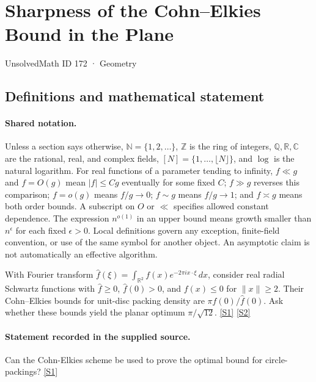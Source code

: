 \documentclass[11pt,a4paper]{article}
\newcommand{\N}{\mathbb{N}}
\newcommand{\Z}{\mathbb{Z}}
\newcommand{\Q}{\mathbb{Q}}
\newcommand{\R}{\mathbb{R}}
\newcommand{\C}{\mathbb{C}}
\newcommand{\sref}[2]{\hyperlink{source:#1:#2}{[S#2]}}
\begin{document}

\setcounter{section}{171}

\section{Sharpness of the Cohn--Elkies Bound in the Plane}\label{172}

{\small\sffamily UnsolvedMath ID 172 · Geometry}

\subsection{Definitions and mathematical statement}

\paragraph{Shared notation.}Unless a section says otherwise, $\N=\{1,2,\ldots\}$,
$\Z$ is the ring of integers, $\Q,\R,\C$ are the rational, real, and complex
fields, $[N]=\{1,\ldots,\lfloor N\rfloor\}$, and $\log$ is the natural
logarithm. For real functions of a parameter tending to infinity,
$f\ll g$ and $f=O(g)$ mean $|f|\leq Cg$ eventually for some fixed $C$;
$f\gg g$ reverses this comparison; $f=o(g)$ means $f/g\to0$;
$f\sim g$ means $f/g\to1$; and $f\asymp g$ means both order bounds.
A subscript on $O$ or $\ll$ specifies allowed constant dependence.
The expression $n^{o(1)}$ in an upper bound means growth smaller than
$n^\epsilon$ for each fixed $\epsilon>0$. Local definitions govern any
exception, finite-field convention, or use of the same symbol for another
object. An asymptotic claim is not automatically an effective algorithm.



With Fourier transform $\widehat f(\xi)=\int_{\R^2}f(x)e^{-2\pi i x\cdot\xi}\,dx$, consider real radial Schwartz functions with $\widehat f\geq0$, $\widehat f(0)>0$, and $f(x)\leq0$ for $\|x\|\geq2$. Their Cohn--Elkies bounds for unit-disc packing density are $\pi f(0)/\widehat f(0)$. Ask whether these bounds yield the planar optimum $\pi/\sqrt{12}$. \sref{172}{1} \sref{172}{2}

\paragraph{Statement recorded in the supplied source.}
Can the Cohn-Elkies scheme be used to prove the optimal bound for circle-packings? \sref{172}{1}
\end{document}
